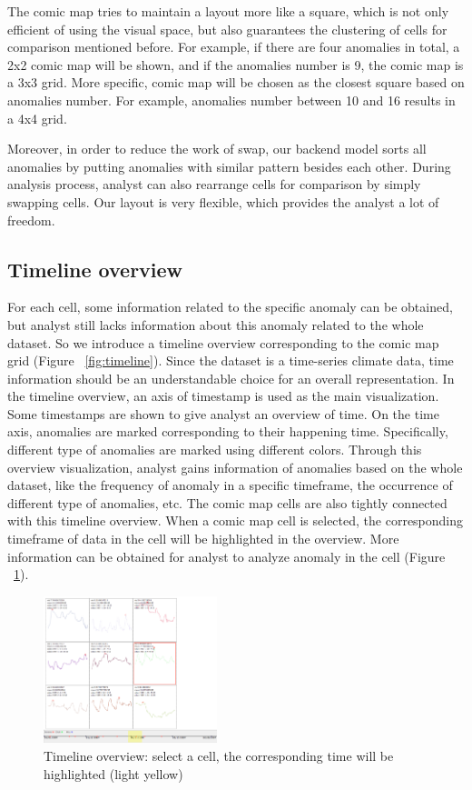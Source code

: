 \documentclass{vgtc}                          %
\begin{document}
The comic map tries to maintain a layout more like a square, which is not only efficient of using the visual space, but also guarantees the clustering of cells for comparison mentioned before. For example, if there are four anomalies in total, a 2x2 comic map will be shown, and if the anomalies number is 9, the comic map is a 3x3 grid. More specific, comic map will be chosen as the closest square based on anomalies number. For example, anomalies number between 10 and 16 results in a 4x4 grid.

Moreover, in order to reduce the work of swap, our backend model sorts all anomalies by putting anomalies with similar pattern besides each other. During analysis process, analyst can also rearrange cells for comparison by simply swapping cells. Our layout is very flexible, which provides the analyst a lot of freedom.

\subsection{Timeline overview}
For each cell, some information related to the specific anomaly can be obtained, but analyst still lacks information about this anomaly related to the whole dataset. So we introduce a timeline overview corresponding to the comic map grid (Figure ~\ref{fig:timeline}). 
Since the dataset is a time-series climate data, time information should be an understandable choice for an overall representation. In the timeline overview, an axis of timestamp is used as the main visualization. Some timestamps are shown to give analyst an overview of time. On the time axis, anomalies are marked corresponding to their happening time. Specifically, different type of anomalies are marked using different colors. Through this overview visualization, analyst gains information of anomalies based on the whole dataset, like the frequency of anomaly in a specific timeframe, the occurrence of different type of anomalies, etc. 
The comic map cells are also tightly connected with this timeline overview. When a comic map cell is selected, the corresponding timeframe of data in the cell will be highlighted in the overview. More information can be obtained for analyst to analyze anomaly in the cell (Figure ~\ref{fig:timeline2}).

\begin{figure}[htb]
	\centering
	\includegraphics[width=0.45\textwidth]{timeline2.png}
	\caption{Timeline overview: select a cell, the corresponding time will be highlighted (light yellow)}
	\label{fig:timeline2}
\end{figure}
\end{document}

